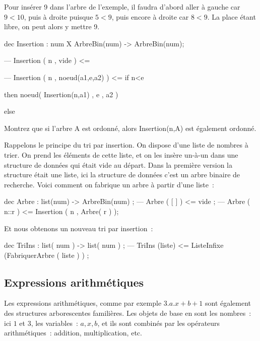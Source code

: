 Pour insérer 9 dans l'arbre de l'exemple, il faudra d'abord aller à
gauche car $9<10$, puis à droite puisque $5<9$, puis encore à droite car
$8<9$. La place étant libre, on peut alors y mettre 9.

\begin{verbatimtab}
dec Insertion : num  X ArbreBin(num) -> ArbreBin(num);

--- Insertion ( n , vide ) <= 

--- Insertion ( n , noeud(a1,e,a2) ) <= if n<e 

			then noeud( Insertion(n,a1) , e , a2 ) 

			else 

\end{verbatimtab}

\begin{exercice}

Montrez que si l'arbre A est ordonné, alors Insertion(n,A) est
également ordonné.
\end{exercice}

Rappelons le principe du tri par insertion. On dispose d'une liste de
nombres à trier. On prend les éléments de cette liste, et on les
insère un-à-un dans une structure de données qui était vide au
départ. Dans la première version la structure était une liste, ici la
structure de données c'est un arbre binaire de recherche. Voici
comment on fabrique un arbre à partir d'une liste~:
\begin{verbatimtab}
dec Arbre : list(num) -> ArbreBin(num) ;
--- Arbre ( [ ] ) <= vide ;
--- Arbre ( n::r ) <= Insertion ( n , Arbre( r ) );
\end{verbatimtab}
Et nous obtenons un nouveau tri par insertion~:
\begin{verbatimtab}
dec TriIns : list( num ) -> list( num ) ;
--- TriIns (liste) <= ListeInfixe (FabriquerArbre ( liste ) ) ;

\end{verbatimtab}

\subsection{ Expressions arithmétiques}

Les expressions arithmétiques, comme par exemple $3.a.x + b + 1$ sont
également des structures arborescentes familières. Les objets de base
en sont les nombres~: ici $1$ et $3$, les variables~: $a, x, b$, et ils sont
combinés par les opérateurs arithmétiques~: addition, multiplication,
etc.

